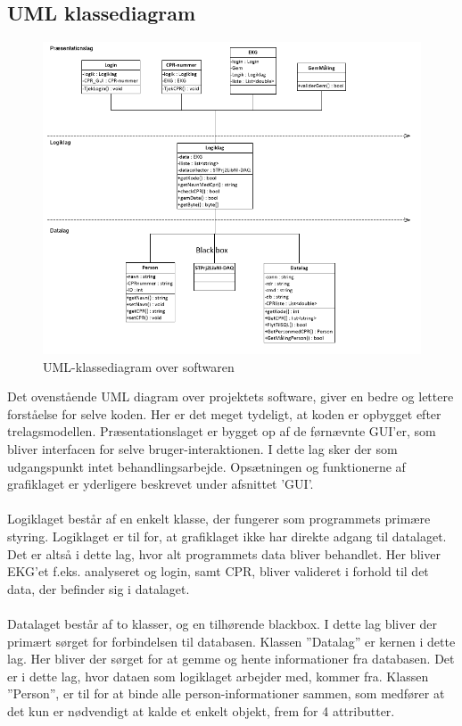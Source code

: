 \subsection{UML klassediagram}

\begin{figure}[H]
	\centering
	\includegraphics[width=1\textwidth]{Figurer/Snip20150430_UML}
	\caption{UML-klassediagram over softwaren}
\end{figure}

Det ovenstående UML diagram over projektets software, giver en bedre og lettere forståelse for selve koden. Her er det meget tydeligt, at koden er opbygget efter trelagsmodellen. Præsentationslaget er bygget op af de førnævnte GUI’er, som bliver interfacen for selve bruger-interaktionen. I dette lag sker der som udgangspunkt intet behandlingsarbejde. Opsætningen og funktionerne af grafiklaget er yderligere beskrevet under afsnittet ’GUI’.\\ \\
Logiklaget består af en enkelt klasse, der fungerer som programmets primære styring. Logiklaget er til for, at grafiklaget ikke har direkte adgang til datalaget. Det er altså i dette lag, hvor alt programmets data bliver behandlet.  Her bliver EKG’et f.eks. analyseret og login, samt CPR, bliver valideret i forhold til det data, der befinder sig i datalaget. \\ \\
Datalaget består af to klasser, og en tilhørende blackbox. I dette lag bliver der primært sørget for forbindelsen til databasen. Klassen ”Datalag” er kernen i dette lag. Her bliver der sørget for at gemme og hente informationer fra databasen. Det er i dette lag, hvor dataen som logiklaget arbejder med, kommer fra. Klassen ”Person”, er til for at binde alle person-informationer sammen, som medfører at det kun er nødvendigt at kalde et enkelt objekt, frem for 4 attributter.

